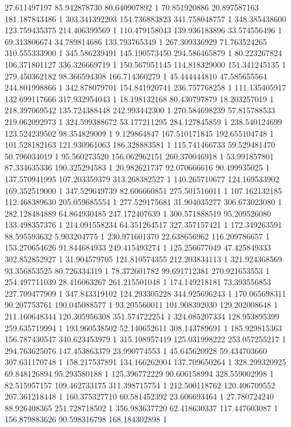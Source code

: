 27.611497197	85.942878730	80.640907892	1
70.851920886	20.897587163	181.187843486	1
303.341392203	154.736883823	341.758048757	1
348.385438600	123.759435375	214.406399569	1
110.479158043	139.936183896	33.574556496	1
69.313806674	34.789814686	133.793765349	1
267.309336929	71.763524265	310.555333900	1
345.586239491	145.190573450	294.586465879	1
80.223267824	106.371801127	336.326669719	1
150.567951145	114.818329000	151.341245135	1
279.450362182	98.366594308	166.714360279	1
45.444444810	47.585655564	244.801998866	1
342.878079701	154.841920741	236.757768258	1
111.135405917	132.699117666	317.932954043	1
18.198132168	80.430797879	18.203257019	1
218.397069542	135.724388448	242.993442300	1
270.584698239	57.815788533	219.062092973	1
324.599388672	53.177211295	284.127845859	1
238.540124699	123.524239502	98.354829009	1
9.129864847	167.510171845	192.655104748	1
101.528182163	121.930961063	186.328883581	1
115.741466733	59.529481470	50.796034019	1
95.560273520	156.062962151	260.370046918	1
53.991857801	87.334635336	190.325294583	1
20.982621737	92.070666616	90.499935025	1
137.570941995	107.203359379	313.268382527	1
140.265710677	124.169533902	169.352519000	1
347.529649739	82.606660851	275.501516011	1
107.162132185	112.468389630	205.059685554	1
277.529175681	31.904035277	306.673023080	1
282.128484889	64.864930485	247.172407639	1
300.571888519	95.209526080	133.498357376	1
214.091558234	64.351264517	327.357157421	1
172.349263591	88.595593632	5.903204775	1
230.971601370	22.638656962	116.209786657	1
153.270654626	91.844684933	249.415493274	1
125.256677049	47.425849333	302.852852927	1
31.904579705	121.810574355	212.203834113	1
321.924368569	93.356853525	80.726334319	1
78.372601782	99.691712381	270.921653553	1
254.497711039	28.416063267	261.215501048	1
174.149218181	73.393556853	227.709477909	1
347.843319102	124.293305228	344.925696243	1
170.065698311	90.207753761	190.045088577	1
93.205560011	101.908392030	129.202008648	1
211.160648344	120.305956308	351.574722254	1
324.085207334	128.953895399	259.635719994	1
193.960538502	52.140652611	308.143789691	1
185.929815363	156.787430547	340.623453979	1
315.108957419	125.031998222	253.057255217	1
294.763625076	147.453863379	23.990774553	1
45.645620928	59.434703660	307.631170748	1
158.217537891	134.166262004	137.709650264	1
328.299320925	69.848126894	95.293580188	1
125.396772229	90.606158994	328.559002998	1
82.515957157	109.462733175	311.398715754	1
212.500118762	120.406709552	207.361218448	1
160.375327710	60.581452392	23.606693464	1
27.780724240	88.926408365	251.728718502	1
356.983637720	62.418630337	117.447603087	1
156.879883626	90.598316798	168.184302898	1
